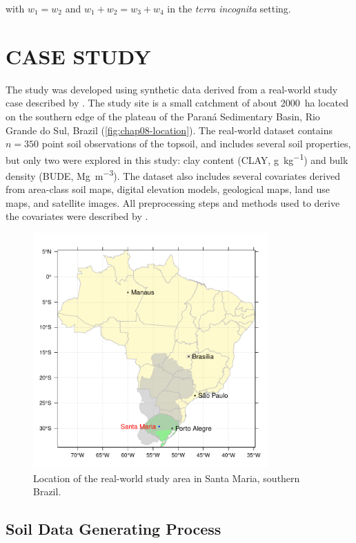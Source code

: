 with $w_1 = w_2$ and $w_1 + w_2 = w_3 + w_4$ in the \emph{terra incognita} setting.

\section{CASE STUDY}

The study was developed using synthetic data derived from a real-world study case described by 
\citet{Samuel-RosaEtAl2015}. The study site is a small catchment of about \SI{2000}{\hectare} located on the 
southern edge of the plateau of the Paraná Sedimentary Basin, Rio Grande do Sul, Brazil 
(\autoref{fig:chap08-location}). The real-world dataset contains $n = 350$ point soil observations of the 
topsoil, and includes several soil properties, but only two were explored in this study: clay content (CLAY, 
\si{\gram\per\kilo\gram}) and bulk density (BUDE, \si{\mega\gram\per\cubic\metre}). The dataset also includes 
several covariates derived from area-class soil maps, digital elevation models, geological maps, land use 
maps, and satellite images. All preprocessing steps and methods used to derive the covariates were described 
by \citet{Samuel-RosaEtAl2015}.

\begin{figure}[!ht]
 \centering
 \includegraphics[width = 90mm]{fig/chap02-location}
 \caption{Location of the real-world study area in Santa Maria, southern Brazil.}
 \label{fig:chap08-location}
\end{figure}

\subsection{Soil Data Generating Process}

